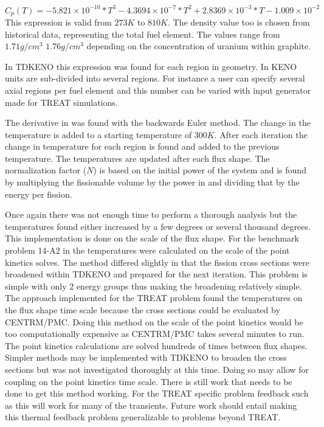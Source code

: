 \documentclass[11pt]{article}
\begin{document}
\begin{equation}
    C_p(T) = -5.821 \times 10^{-10}*T^3 - 4.3694\times 10^{-7}*T^2 + 2.8369\times 10^{-3}*T - 1.009\times 10^{-2}
\end{equation}
This expression is valid from $273K$ to $810K$. The density value too is chosen from historical data, representing the total fuel element.   The values range from $1.71 g/cm^3$ $1.76g/cm^3$ depending on the concentration of uranium within graphite. 

In TDKENO this expression was found for each region in  geometry.  In KENO units are sub-divided into several regions. For instance a user can specify several axial regions per fuel element and this number can be varied with input generator made for TREAT simulations.  

The derivative in \label{adiabatic} was found with the backwards Euler method. The change in the temperature is added to a starting temperature of $300K$.  After each iteration the change in temperature for each region is found and added to the previous temperature. The temperatures are updated after each flux shape. The normalization factor ($N$) is based on the initial power of the system and is found by multiplying the fissionable volume by the power in and dividing that by the energy per fission. 

Once again there was not enough time to perform a thorough analysis but the temperatures found either increased by a few degrees or several thousand degrees.  This implementation is done on the scale of the flux shape.  For the benchmark problem 14-A2 in \cite{Bentley} the temperatures were calculated on the scale of the point kinetics solves.  The method differed slightly in that the fission cross sections were broadened within TDKENO and prepared for the next iteration.  This problem is simple with only 2 energy groups thus making the broadening relatively simple.  The approach implemented for the TREAT problem found the temperatures on the flux shape time scale because the cross sections could be evaluated by CENTRM/PMC.  Doing this method on the scale of the point kinetics would be too computationally expensive as CENTRM/PMC takes several minutes to run. The point kinetics calculations are solved hundreds of times between flux shapes.  Simpler methods may be implemented with TDKENO to broaden the cross sections but was not investigated thoroughly at this time.  Doing so may allow for coupling on the point kinetics time scale.   There is still work that needs to be done to get this method working.  For the TREAT specific problem feedback such as this will work for many of the transients. Future work should entail making this thermal feedback problem generalizable to problems beyond TREAT. 
\end{document}
